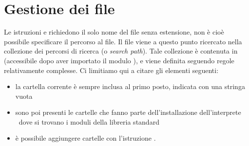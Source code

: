 \section{Gestione dei file}

Le istruzioni  e  richiedono il solo nome del
file senza estensione, non \`e cio\`e possibile specificare il
percorso al file. Il file viene a questo punto ricercato nella
collezione dei percorsi di ricerca (o
\emph{search path}). Tale collezione \`e contenuta in
 (accessibile dopo aver importato il modulo
), e viene definita seguendo regole relativamente complesse.
Ci limitiamo qui a citare gli elementi seguenti:
\begin{itemize}
\item la cartella corrente \`e sempre inclusa al primo posto, indicata
con una stringa vuota
\item sono poi presenti le cartelle che fanno parte dell'installazione
dell'interprete \python\ dove si trovano i moduli della libreria
standard
\item \`e possibile aggiungere cartelle con l'istruzione
.
\end{itemize}

